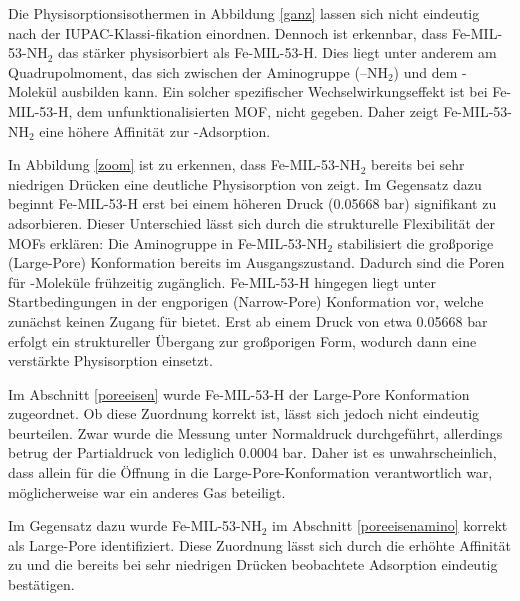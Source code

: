\documentclass[12pt, a4paper]{article}
\begin{document}
\noindent
Die Physisorptionsisothermen in Abbildung \ref{ganz} lassen sich nicht eindeutig nach der IUPAC-Klassi-fikation einordnen. Dennoch ist erkennbar, dass Fe-MIL-53-NH$_2$ das  stärker physisorbiert als Fe-MIL-53-H. Dies liegt unter anderem am Quadrupolmoment, das sich zwischen der Aminogruppe (–NH$_2$) und dem -Molekül ausbilden kann.
Ein solcher spezifischer Wechselwirkungseffekt ist bei Fe-MIL-53-H, dem unfunktionalisierten MOF, nicht gegeben. Daher zeigt Fe-MIL-53-NH$_2$ eine höhere Affinität zur -Adsorption.

\noindent
In Abbildung \ref{zoom} ist zu erkennen, dass Fe-MIL-53-NH$_2$ bereits bei sehr niedrigen Drücken eine deutliche Physisorption von  zeigt. Im Gegensatz dazu beginnt Fe-MIL-53-H erst bei einem höheren Druck (0.05668 bar) signifikant  zu adsorbieren.
Dieser Unterschied lässt sich durch die strukturelle Flexibilität der MOFs erklären: Die Aminogruppe in Fe-MIL-53-NH$_2$ stabilisiert die großporige (Large-Pore) Konformation bereits im Ausgangszustand. Dadurch sind die Poren für -Moleküle frühzeitig zugänglich.
Fe-MIL-53-H hingegen liegt unter Startbedingungen in der engporigen (Narrow-Pore) Konformation vor, welche zunächst keinen Zugang für  bietet. Erst ab einem Druck von etwa 0.05668 bar erfolgt ein struktureller Übergang zur großporigen Form, wodurch dann eine verstärkte Physisorption einsetzt.

\noindent
Im Abschnitt \ref{poreeisen} wurde Fe-MIL-53-H der Large-Pore Konformation zugeordnet. Ob diese Zuordnung korrekt ist, lässt sich jedoch nicht eindeutig beurteilen. Zwar wurde die Messung unter Normaldruck durchgeführt, allerdings betrug der Partialdruck von  lediglich 0.0004 bar. Daher ist es unwahrscheinlich, dass  allein für die Öffnung in die Large-Pore-Konformation verantwortlich war, möglicherweise war ein anderes Gas beteiligt.

\noindent
Im Gegensatz dazu wurde Fe-MIL-53-NH$_2$ im Abschnitt \ref{poreeisenamino} korrekt als Large-Pore identifiziert. Diese Zuordnung lässt sich durch die erhöhte Affinität zu  und die bereits bei sehr niedrigen Drücken beobachtete Adsorption eindeutig bestätigen.

\newpage
\end{document}
